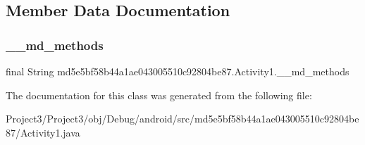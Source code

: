 \subsection{Member Data Documentation}
\mbox{\label{classmd5e5bf58b44a1ae043005510c92804be87_1_1Activity1_a610e6be497ac42c587579ff31c932994}} 
\subsubsection{\texorpdfstring{\+\_\+\+\_\+md\+\_\+methods}{\_\_md\_methods}}
{\footnotesize\ttfamily final String md5e5bf58b44a1ae043005510c92804be87.\+Activity1.\+\_\+\+\_\+md\+\_\+methods\hspace{0.3cm}{\ttfamily [static]}}



The documentation for this class was generated from the following file\+:\begin{DoxyCompactItemize}
\item 
Project3/\+Project3/obj/\+Debug/android/src/md5e5bf58b44a1ae043005510c92804be87/Activity1.\+java\end{DoxyCompactItemize}
